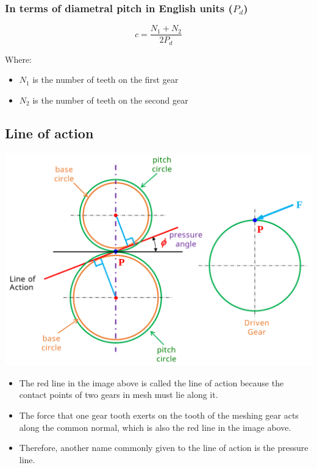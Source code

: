 \documentclass[11pt]{article}
\begin{document}
\subsubsection{In terms of diametral pitch in English units (\(P_d\))}
\label{sec:orgb4c7cb0}
\[c = \frac{N_1 + N_2}{2 P_d}\]

Where:
\begin{itemize}
\item \(N_1\) is the number of teeth on the first gear
\item \(N_2\) is the number of teeth on the second gear
\end{itemize}

 \newpage
\subsection{Line of action}
\label{sec:org8fec96f}
\begin{center}
\includegraphics[width=.9\linewidth]{./images/gear-contact-geometry-diagram.png}
\end{center}
\begin{itemize}
\item The red line in the image above is called the line of action because the contact points of two gears in mesh must lie along it.
\item The force that one gear tooth exerts on the tooth of the meshing gear acts along the common normal, which is also the red line in the image above.
\item Therefore, another name commonly given to the line of action is the pressure line.
\end{itemize}
\end{document}
